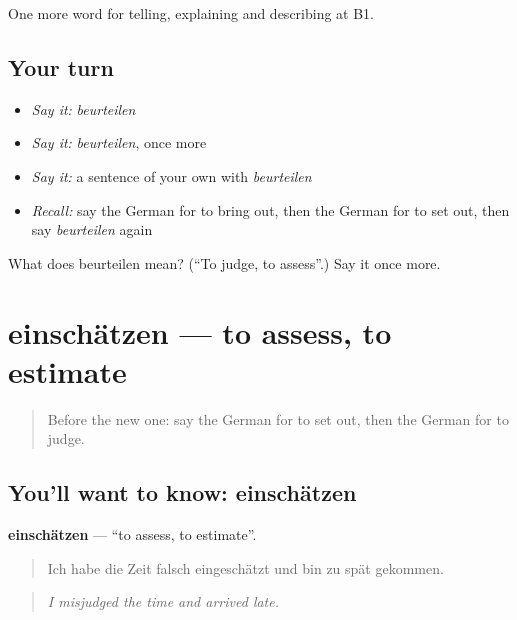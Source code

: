\begin{grammarlens}[title={What you've built}]
One more word for telling, explaining and describing at B1.
\end{grammarlens}

\subsection*{Your turn}
\begin{itemize}
\raggedright
  \item \emph{Say it:} \emph{beurteilen}
  \item \emph{Say it:} \emph{beurteilen}, once more
  \item \emph{Say it:} a sentence of your own with \emph{beurteilen}
  \item \emph{Recall:} say the German for to bring out, then the German for to set out, then say \emph{beurteilen} again
\end{itemize}

\begin{tcolorbox}[breakable,colback=teal!4,colframe=teal!35!black,title={Before you move on}]
What does beurteilen mean? (\textquotedblleft{}To judge, to assess\textquotedblright{}.) Say it once more.
\end{tcolorbox}
\section[einschätzen]{einschätzen — to assess, to estimate}

\label{lesson:GE-C340-einschaetzen}



\begin{quote}
Before the new one: say the German for to set out, then the German for to judge.
\end{quote}

\subsection*{You'll want to know: einschätzen}
\textbf{einschätzen} — \textquotedblleft{}to assess, to estimate\textquotedblright{}.

\begin{quote}
Ich habe die Zeit falsch eingeschätzt und bin zu spät gekommen.
\end{quote}

\begin{quote}
\emph{I misjudged the time and arrived late.}
\end{quote}

